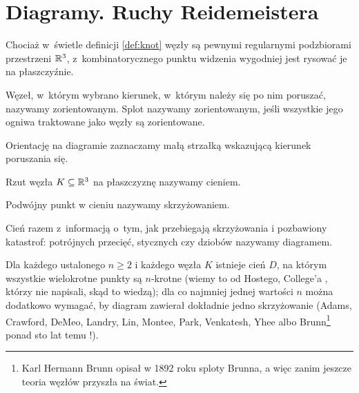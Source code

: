
\section{Diagramy. Ruchy Reidemeistera}

Chociaż w~świetle definicji \ref{def:knot} węzły są pewnymi regularnymi podzbiorami przestrzeni $\mathbb R^3$, z~kombinatorycznego punktu widzenia wygodniej jest rysować je na płaszczyźnie.

\begin{definition}[orientacja]
%
%
    Węzeł, w~którym wybrano kierunek, w~którym należy się po nim poruszać, nazywamy zorientowanym.
    Splot nazywamy zorientowanym, jeśli wszystkie jego ogniwa traktowane jako węzły są zorientowane.
\end{definition}

Orientację na diagramie zaznaczamy małą strzałką wskazującą kierunek poruszania się.

\begin{definition}
%
    Rzut węzła $K \subseteq \mathbb R^3$ na płaszczyznę nazywamy cieniem.
\end{definition}

\begin{definition}[skrzyżowanie]
\label{def:crossing}%
%
    Podwójny punkt w cieniu nazywamy skrzyżowaniem.
\end{definition}

\begin{definition}[diagram]
%
    Cień razem z~informacją o~tym, jak przebiegają skrzyżowania i pozbawiony katastrof: potrójnych przecięć, stycznych czy dziobów nazywamy diagramem.
\end{definition}

Dla każdego ustalonego $n \ge 2$ i każdego węzła $K$ istnieje cień $D$, na którym wszystkie wielokrotne punkty są $n$-krotne (wiemy to od Hostego, College'a \cite[s. 11]{adams2021}, którzy nie napisali, skąd to wiedzą);
%
%
dla co najmniej jednej wartości $n$ można dodatkowo wymagać, by diagram zawierał dokładnie jedno skrzyżowanie (Adams, Crawford, DeMeo, Landry, Lin, Montee, Park, Venkatesh, Yhee \cite{venkatesh2015} albo Brunn\footnote{Karl Hermann Brunn opisał w 1892 roku sploty Brunna, a więc zanim jeszcze teoria węzłów przyszła na świat.} ponad sto lat temu \cite[s. 28]{adams2021}!).
%
%
%
%
%
%
%
%

